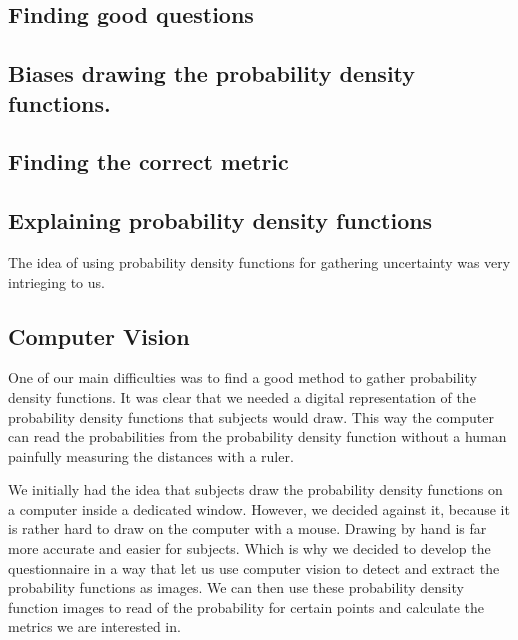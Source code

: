 \documentclass[../main/main.tex]{subfiles}
\begin{document}
	
	\subsection{Finding good questions}
	\subsection{Biases drawing the probability density functions.}
	
	\subsection{Finding the correct metric}
	
	
	
	\subsection{Explaining probability density functions}
	
	The idea of using probability density functions for gathering uncertainty was very intrieging to us.
	
	
	\subsection{Computer Vision}
	
	One of our main difficulties was to find a good method to gather probability density functions. It was clear that we needed a digital representation of the probability density functions that subjects would draw. This way the computer can read the probabilities from the probability density function without a human painfully measuring the distances with a ruler.
	
	We initially had the idea that subjects draw the probability density functions on a computer inside a dedicated window. However, we decided against it, because it is rather hard to draw on the computer with a mouse. Drawing by hand is far more accurate and easier for subjects. Which is why we decided to develop the questionnaire in a way that let us use computer vision to detect and extract the probability functions as images. We can then use these probability density function images to read of the probability for certain points and calculate the metrics we are interested in.
	
\end{document}
